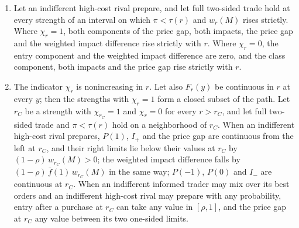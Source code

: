 \begin{proposition}
\begin{enumerate}[label=(\roman*),leftmargin=2em]
\begin{enumerate}[label=(\alph*),leftmargin=2em]
\item Let an indifferent high-cost rival prepare, and let full two-sided trade hold at every strength of an
interval on which \(\pi<\tau(r)\) and \(w_r(M)\) rises strictly. Where \(\chi_r=1\), both components of the price gap,
both impacts, the price gap and the weighted impact difference rise strictly with \(r\). Where \(\chi_r=0\), the
entry component and the weighted impact difference are zero, and the class component, both impacts and the price
gap rise strictly with \(r\).
\item The indicator \(\chi_r\) is nonincreasing in \(r\). Let also \(F_r(y)\) be continuous in \(r\) at every \(y\);
then the strengths with \(\chi_r=1\) form a closed subset of the path. Let \(r_C\) be a strength with
\(\chi_{r_C}=1\) and \(\chi_r=0\) for every \(r>r_C\), and let full two-sided trade and \(\pi<\tau(r)\) hold on a
neighborhood of \(r_C\). When an indifferent
high-cost rival prepares, \(P(1)\), \(I_+\) and the price gap are continuous from the left at \(r_C\), and their
right limits lie below their values at \(r_C\) by \((1-\rho)\,w_{r_C}(M)>0\); the weighted impact difference falls
by \((1-\rho)\,\bar f(1)\,w_{r_C}(M)\) in the same way; \(P(-1)\), \(P(0)\) and \(I_-\) are continuous at \(r_C\).
When an indifferent informed trader may mix over its best orders and an indifferent high-cost rival may prepare with
any probability, entry after a purchase at \(r_C\) can take
any value in \([\rho,1]\), and the price gap at \(r_C\) any value between its two one-sided limits.
\end{enumerate}
\end{enumerate}
\end{proposition}


